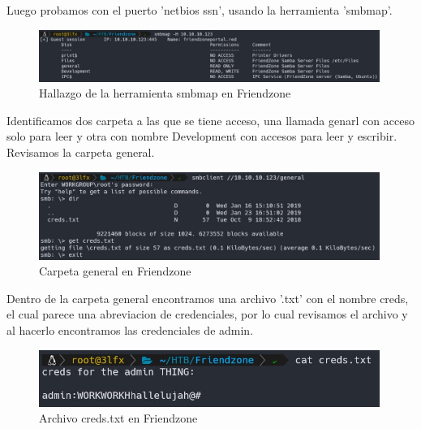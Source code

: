         \large{Luego probamos con el puerto 'netbios ssn', usando la herramienta 'smbmap'.}
        \par
        \begin{figure}[H]
            \centering
            \includegraphics[width=0.99\textwidth]{informe4/imagenes/friendzone/03_smbmap.png}
            \caption{Hallazgo de la herramienta smbmap en Friendzone} 
        \end{figure}

        \large{Identificamos dos carpeta a las que se tiene acceso, una llamada genarl con acceso solo para leer y otra con nombre Development con accesos para leer y escribir. Revisamos la carpeta general.}
        \par
        \begin{figure}[H]
            \centering
            \includegraphics[width=0.99\textwidth]{informe4/imagenes/friendzone/04_smb_creds.png}
            \caption{Carpeta general en Friendzone} 
        \end{figure}

        \large{Dentro de la carpeta general encontramos una archivo '.txt' con el nombre creds, el cual parece una abreviacion de credenciales, por lo cual revisamos el archivo y al hacerlo encontramos las credenciales de admin.}
        \par
        \begin{figure}[H]
            \centering
            \includegraphics[width=0.99\textwidth]{informe4/imagenes/friendzone/05_cred_friendzone.png}
            \caption{Archivo creds.txt en Friendzone} 
        \end{figure}




